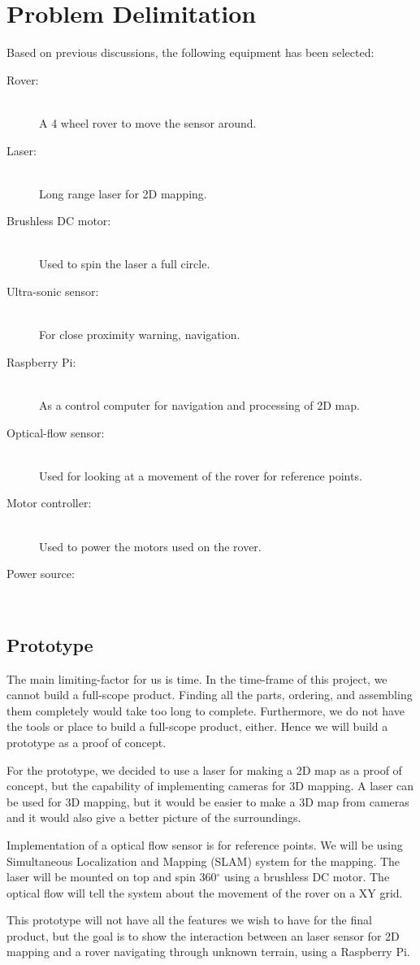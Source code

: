 \section{Problem Delimitation}
Based on previous discussions, the following equipment has been selected:

\begin{description}
  \item[Rover:] \hfill \\
  A 4 wheel rover to move the sensor around.
  \item[Laser:] \hfill \\
  Long range laser for 2D mapping.
  \item[Brushless DC motor:] \hfill \\
  Used to spin the laser a full circle.
  \item[Ultra-sonic sensor:] \hfill \\
  For close proximity warning, navigation.
  \item[Raspberry Pi:] \hfill \\
  As a control computer for navigation and processing of 2D map.
  \item[Optical-flow sensor:] \hfill \\
  Used for looking at a movement of the rover for reference points.
  \item[Motor controller:] \hfill \\
  Used to power the motors used on the rover.
  \item[Power source:] \hfill \\
\end{description}

\subsection{Prototype}
The main limiting-factor for us is time. In the time-frame of this project, we cannot build a full-scope product. Finding all the parts, ordering, and assembling them completely would take too long to complete. Furthermore, we do not have the tools or place to build a full-scope product, either. Hence we will build a prototype as a proof of concept.

For the prototype, we decided to use a laser for making a 2D map as a proof of concept, but the capability of implementing cameras for 3D mapping. A laser can be used for 3D mapping, but it would be easier to make a 3D map from cameras and it would also give a better picture of the surroundings.

Implementation of a optical flow sensor is for reference points. We will be using Simultaneous Localization and Mapping (SLAM) system for the mapping. The laser will be mounted on top and spin 360$^{\circ}$ using a brushless DC motor. The optical flow will tell the system about the movement of the rover on a XY grid. 

This prototype will not have all the features we wish to have for the final product, but the goal is to show the interaction between an laser sensor for 2D mapping and a rover navigating through unknown terrain, using a Raspberry Pi.

